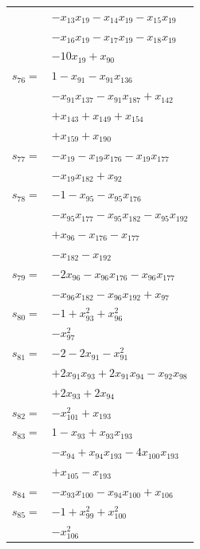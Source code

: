 \begin{longtable}{@{}r@{\;}l@{}}
 & \(\displaystyle -x_{13}x_{19} -x_{14}x_{19} -x_{15}x_{19}\) \\
 & \(\displaystyle -x_{16}x_{19} -x_{17}x_{19} -x_{18}x_{19}\) \\
 & \(\displaystyle -10x_{19} +x_{90}\) \\[3pt]
\(s_{76}=\) & \(\displaystyle 1 -x_{91} -x_{91}x_{136}\) \\
 & \(\displaystyle -x_{91}x_{137} -x_{91}x_{187} +x_{142}\) \\
 & \(\displaystyle +x_{143} +x_{149} +x_{154}\) \\
 & \(\displaystyle +x_{159} +x_{190}\) \\[3pt]
\(s_{77}=\) & \(\displaystyle -x_{19} -x_{19}x_{176} -x_{19}x_{177}\) \\
 & \(\displaystyle -x_{19}x_{182} +x_{92}\) \\[3pt]
\(s_{78}=\) & \(\displaystyle -1 -x_{95} -x_{95}x_{176}\) \\
 & \(\displaystyle -x_{95}x_{177} -x_{95}x_{182} -x_{95}x_{192}\) \\
 & \(\displaystyle +x_{96} -x_{176} -x_{177}\) \\
 & \(\displaystyle -x_{182} -x_{192}\) \\[3pt]
\(s_{79}=\) & \(\displaystyle -2x_{96} -x_{96}x_{176} -x_{96}x_{177}\) \\
 & \(\displaystyle -x_{96}x_{182} -x_{96}x_{192} +x_{97}\) \\[3pt]
\(s_{80}=\) & \(\displaystyle -1 +x_{93}^{2} +x_{96}^{2}\) \\
 & \(\displaystyle -x_{97}^{2}\) \\[3pt]
\(s_{81}=\) & \(\displaystyle -2 -2x_{91} -x_{91}^{2}\) \\
 & \(\displaystyle +2x_{91}x_{93} +2x_{91}x_{94} -x_{92}x_{98}\) \\
 & \(\displaystyle +2x_{93} +2x_{94}\) \\[3pt]
\(s_{82}=\) & \(\displaystyle -x_{101}^{2} +x_{193}\) \\[3pt]
\(s_{83}=\) & \(\displaystyle 1 -x_{93} +x_{93}x_{193}\) \\
 & \(\displaystyle -x_{94} +x_{94}x_{193} -4x_{100}x_{193}\) \\
 & \(\displaystyle +x_{105} -x_{193}\) \\[3pt]
\(s_{84}=\) & \(\displaystyle -x_{93}x_{100} -x_{94}x_{100} +x_{106}\) \\[3pt]
\(s_{85}=\) & \(\displaystyle -1 +x_{99}^{2} +x_{100}^{2}\) \\
 & \(\displaystyle -x_{106}^{2}\) \\[3pt]

\end{longtable}
